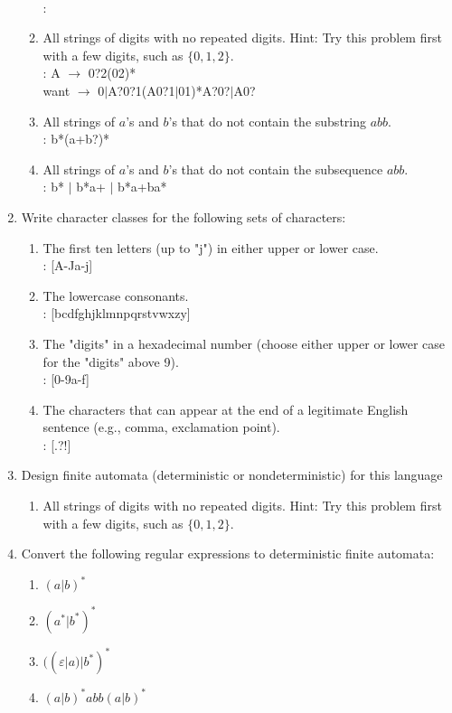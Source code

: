 \documentclass{article}
\begin{document}
\begin{enumerate}
\begin{enumerate}
        \\ : 
        \item All strings of digits with no repeated digits. Hint: Try this problem first with a few digits, such as $\{0, 1, 2\}$.
        \\ : A $\rightarrow$ 0?2(02)*
        \\ want $\rightarrow$ 0$\mid$A?0?1(A0?1$\mid$01)*A?0?$\mid$A0?
        \item All strings of $a$'s and $b$'s that do not contain the substring $abb$.
        \\ : b*(a+b?)*
        \item All strings of $a$'s and $b$'s that do not contain the subsequence $abb$.
        \\ : b* $\mid$ b*a+ $\mid$ b*a+ba*
    \end{enumerate}
    \item Write character classes for the following sets of characters:
    \begin{enumerate}
        \item The first ten letters (up to "j") in either upper or lower case.
        \\ : [A-Ja-j]
        \item The lowercase consonants.
        \\ : [bcdfghjklmnpqrstvwxzy]
        \item The "digits" in a hexadecimal number (choose either upper or lower case for the "digits" above 9).
        \\ : [0-9a-f]
        \item The characters that can appear at the end of a legitimate English sentence (e.g., comma, exclamation point).
        \\ : [.?!]
    \end{enumerate}
    \item Design finite automata (deterministic or nondeterministic) for this language
    \begin{enumerate}
        \item All strings of digits with no repeated digits. Hint: Try this problem first with a few digits, such as $\{0, 1, 2\}$.
        \vfill
    \end{enumerate}
    \item Convert the following regular expressions to deterministic finite automata:
    \begin{enumerate}
        \item $(a|b)^*$
        \item $(a^*|b^*)^*$
        \item $((\varepsilon|a)|b^*)^*$
        \item $(a|b)^*abb(a|b)^*$
    \end{enumerate}
\end{enumerate}
\end{document}
